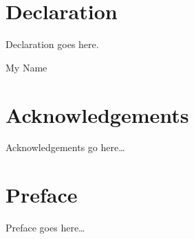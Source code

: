 \chapter*{Declaration}
\thispagestyle{empty}
  Declaration goes here.
  \vspace*{1cm}
  \begin{flushright}
    My Name
  \end{flushright}
\clearpage

\chapter*{Acknowledgements}
\thispagestyle{empty}
Acknowledgements go here\dots
\clearpage

\chapter*{Preface}
\thispagestyle{empty}
Preface goes here\dots
\clearpage

\listoftodos

\tableofcontents

